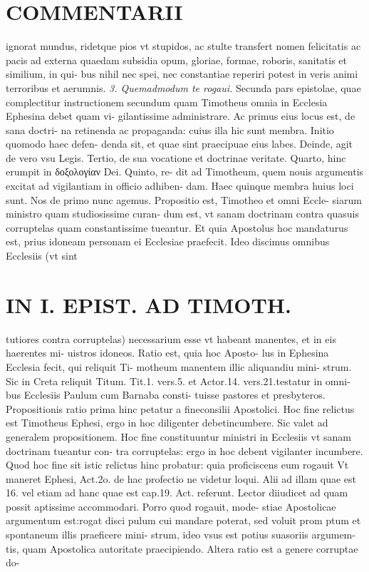 \documentclass{article}
\begin{document}
\begin{pages}
\section*{COMMENTARII }
\marginpar{[ p.16 ]}\pstart ignorat mundus, ridetque pios vt stupidos, ac stulte transfert nomen felicitatis ac pacis ad externa quaedam subsidia opum, gloriae, formae, roboris, sanitatis et similium, in qui- bus nihil nec spei, nec constantiae reperiri potest in veris animi terroribus et aerumnis.  \pend
\textit{3. Quemadmodum te rogaui. }\pstart Secunda pars epistolae, quae complectitur instructionem secundum quam Timotheus omnia in Ecclesia Ephesina debet quam vi- gilantissime administrare.  \pend\pstart Ac primus eius locus est, de sana doctri- na retinenda ac propaganda: cuius illa hic sunt membra. Initio quomodo haec defen- denda sit, et quae sint praecipuae eius labes. Deinde, agit de vero vsu Legis. Tertio, de sua vocatione et doctrinae veritate. Quarto, hinc erumpit in δοξολογίαν Dei. Quinto, re- dit ad Timotheum, quem nouis argumentis excitat ad vigilantiam in officio adhiben- dam. Haec quinque membra huius loci sunt. Nos de primo nunc agemus.  \pend\pstart Propositio est, Timotheo et omni Eccle- siarum ministro quam studiosissime curan- dum est, vt sanam doctrinam contra quasuis corruptelas quam constantissime tueantur. Et quia Apostolus hoc mandaturus est, prius idoneam personam ei Ecclesiae praefecit. Ideo discimus omnibus Ecclesiis (vt sint  \pend
\section*{IN I. EPIST. AD TIMOTH. }
\marginpar{[ p.17 ]}\pstart tutiores contra corruptelas) necessarium esse vt habeant manentes, et in eis haerentes mi- uistros idoneos. Ratio est, quia hoc Aposto- lus in Ephesina Ecclesia fecit, qui reliquit Ti- motheum manentem illic aliquandiu mini- strum. Sic in Creta reliquit Titum. Tit.1. vers.5. et Actor.14. vers.21.testatur in omni- bus Ecclesiis Paulum cum Barnaba consti- tuisse pastores et presbyteros.  \pend\pstart Propositionis ratio prima hinc petatur a fineconsilii Apostolici. Hoc fine relictus est Timotheus Ephesi, ergo in hoc diligenter debetincumbere. Sic valet ad generalem propositionem. Hoc fine constituuntur ministri in Ecclesiis vt sanam doctrinam tueantur con- tra corruptelas: ergo in hoc debent vigilanter incumbere. Quod hoc fine sit istic relictus hinc probatur: quia proficiscens eum rogauit Vt maneret Ephesi, Act.2o. de hac profectio ne videtur loqui. Alii ad illam quae est 16. vel etiam ad hanc quae est cap.19. Act. referunt. Lector diiudicet ad quam possit aptissime accommodari. Porro quod rogauit, mode- stiae Apostolicae argumentum est:rogat disci pulum cui mandare poterat, sed voluit prom ptum et spontaneum illis praeficere mini- strum, ideo vsus est potius suasoriis argumem- tis, quam Apostolica autoritate praecipiendo. Altera ratio est a genere corruptae do-  \pend

\end{pages}
\end{document}
